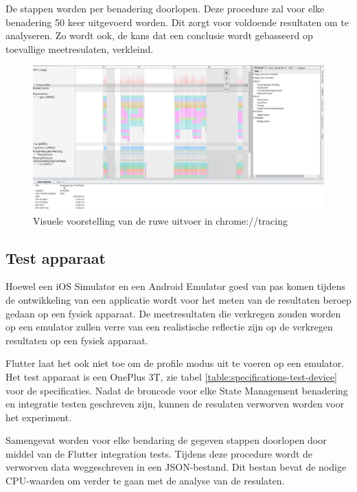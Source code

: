 De stappen worden per benadering doorlopen. Deze procedure zal voor elke benadering 50 keer uitgevoerd worden. Dit zorgt voor voldoende resultaten om te analyseren. Zo wordt ook, de kans dat een conclusie wordt gebasseerd op toevallige meetresulaten, verkleind.

\begin{figure}[H]
    \includegraphics[width=\linewidth]{img/methodologie/chrome-tracing-timeline.jpg}
    \caption{Visuele voorstelling van de ruwe uitvoer in chrome://tracing}
    \label{fig:chrome-tracing-timeline}
\end{figure}


\subsection{Test apparaat}
Hoewel een iOS Simulator en een Android Emulator goed van pas komen tijdens de ontwikkeling van een applicatie wordt voor het meten van de resultaten beroep gedaan op een fysiek apparaat. De meetresultaten die verkregen zouden worden op een emulator zullen verre van een realistische reflectie zijn op de verkregen resultaten op een fysiek apparaat. \autocite{Flutter2019c}

Flutter laat het ook niet toe om de profile modus uit te voeren op een emulator.
Het test apparaat is een OnePlus 3T, zie tabel \ref{table:specifications-test-device} voor de specificaties.
Nadat de broncode voor elke State Management benadering en integratie testen geschreven zijn, kunnen de resulaten verworven worden voor het experiment.

Samengevat worden voor elke bendaring de gegeven stappen doorlopen door middel van de Flutter integration tests. Tijdens deze procedure wordt de verworven data weggeschreven in een JSON-bestand. Dit bestan bevat de nodige CPU-waarden om verder te gaan met de analyse van de resulaten.

